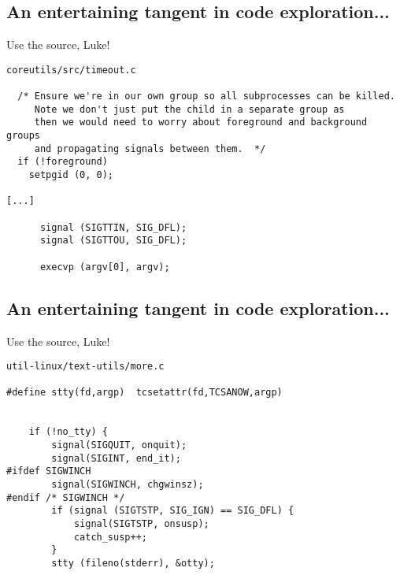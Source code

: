 \documentclass[xga]{xdvislides}
\begin{document}
\subsection{An entertaining tangent in code exploration...}
Use the source, Luke!
\\

\begin{verbatim}
coreutils/src/timeout.c

  /* Ensure we're in our own group so all subprocesses can be killed.
     Note we don't just put the child in a separate group as
     then we would need to worry about foreground and background groups
     and propagating signals between them.  */
  if (!foreground)
    setpgid (0, 0);

[...]

      signal (SIGTTIN, SIG_DFL);
      signal (SIGTTOU, SIG_DFL);

      execvp (argv[0], argv);
\end{verbatim}

\subsection{An entertaining tangent in code exploration...}
Use the source, Luke!
\\

\begin{verbatim}
util-linux/text-utils/more.c

#define stty(fd,argp)  tcsetattr(fd,TCSANOW,argp)


    if (!no_tty) {
        signal(SIGQUIT, onquit);
        signal(SIGINT, end_it);
#ifdef SIGWINCH
        signal(SIGWINCH, chgwinsz);
#endif /* SIGWINCH */
        if (signal (SIGTSTP, SIG_IGN) == SIG_DFL) {
            signal(SIGTSTP, onsusp);
            catch_susp++;
        }
        stty (fileno(stderr), &otty);

\end{verbatim}
\end{document}
